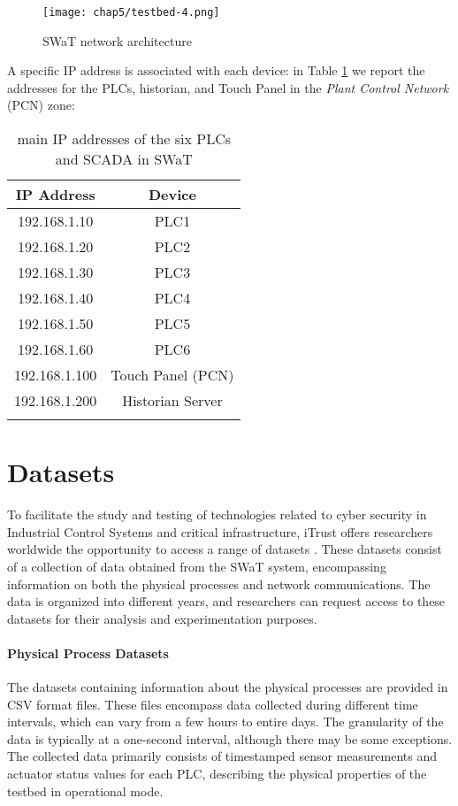 \begin{figure}[ht]
	\centering
	\texttt{[image: chap5/testbed-4.png]}
	\caption{SWaT network architecture}
	\label{fig:5_swat_network_arch}
\end{figure}

A specific IP address is associated with each device: in Table \ref{table:5_swat_ip_addresses} we report the addresses for the PLCs, historian, and Touch Panel in the \textit{Plant Control Network} (PCN) zone:

\begin{longtable}[c]{| c | c |}
	\hline
	\textbf{IP Address} & \textbf{Device} \\ [0.5ex] 
	\hline
	192.168.1.10 & PLC1 \\
	\hline 
	192.168.1.20 & PLC2 \\
	\hline
	192.168.1.30 & PLC3 \\
	\hline
	192.168.1.40 & PLC4 \\
	\hline
	192.168.1.50 & PLC5 \\
	\hline
	192.168.1.60 & PLC6 \\
	\hline
	192.168.1.100 & {Touch Panel (PCN)} \\
	\hline
	192.168.1.200 & Historian Server \\
	\hline
	
	\caption{main IP addresses of the six PLCs and SCADA in SWaT}
	\label{table:5_swat_ip_addresses}
\end{longtable}

\section{Datasets}
\label{sec:5_swat_datasets}

To facilitate the study and testing of technologies related to cyber security in Industrial Control Systems and critical infrastructure, iTrust offers researchers worldwide the opportunity to access a range of datasets \cite{swat_datasets}. These datasets consist of a collection of data obtained from the SWaT system, encompassing information on both the physical processes and network communications. The data is organized into different years, and researchers can request access to these datasets for their analysis and experimentation purposes.

\bigskip
\paragraph{Physical Process Datasets}
The datasets containing information about the physical processes are provided in CSV format files. These files encompass data collected during different time intervals, which can vary from a few hours to entire days. The granularity of the data is typically at a one-second interval, although there may be some exceptions. The collected data primarily consists of timestamped sensor measurements and actuator status values for each PLC, describing the physical properties of the testbed in operational mode.

